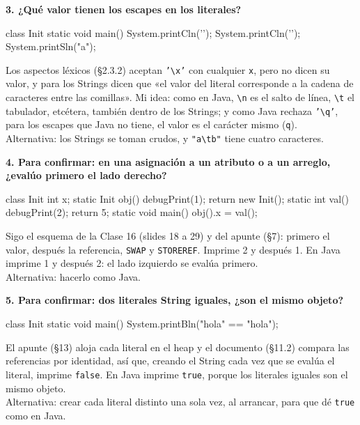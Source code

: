 \documentclass[12pt,a4paper]{article}
\newcommand{\cod}[1]{\texttt{#1}}
\newcommand{\pregunta}[1]{\par\medskip\needspace{4\baselineskip}\noindent\textbf{#1}\par\smallskip}
\begin{document}
\pregunta{3. ¿Qué valor tienen los escapes en los literales?}

\begin{fuente}
class Init {
    static void main() {
        System.printCln('\n');
        System.printCln('\q');
        System.printSln("a\tb");
    }
}
\end{fuente}

Los aspectos léxicos (§2.3.2) aceptan \cod{'\textbackslash x'} con cualquier \cod{x}, pero no dicen
su valor, y para los Strings dicen que «el valor del literal corresponde a la cadena de caracteres
entre las comillas». Mi idea: como en Java, \cod{\textbackslash n} es el salto de línea,
\cod{\textbackslash t} el tabulador, etcétera, también dentro de los Strings; y como Java rechaza
\cod{'\textbackslash q'}, para los escapes que Java no tiene, el valor es el carácter mismo
(\cod{q}).\\
Alternativa: los Strings se toman crudos, y \cod{"a\textbackslash tb"} tiene cuatro caracteres.

\pregunta{4. Para confirmar: en una asignación a un atributo o a un arreglo, ¿evalúo primero el lado derecho?}

\begin{fuente}
class Init {
    int x;
    static Init obj() { debugPrint(1); return new Init(); }
    static int val() { debugPrint(2); return 5; }
    static void main() {
        obj().x = val();
    }
}
\end{fuente}

Sigo el esquema de la Clase 16 (slides 18 a 29) y del apunte (§7): primero el valor, después la
referencia, \cod{SWAP} y \cod{STOREREF}. Imprime 2 y después 1. En Java imprime 1 y después 2: el
lado izquierdo se evalúa primero.\\
Alternativa: hacerlo como Java.

\pregunta{5. Para confirmar: dos literales String iguales, ¿son el mismo objeto?}

\begin{fuente}
class Init {
    static void main() {
        System.printBln("hola" == "hola");
    }
}
\end{fuente}

El apunte (§13) aloja cada literal en el heap y el documento (§11.2) compara las referencias por
identidad, así que, creando el String cada vez que se evalúa el literal, imprime \cod{false}. En
Java imprime \cod{true}, porque los literales iguales son el mismo objeto.\\
Alternativa: crear cada literal distinto una sola vez, al arrancar, para que dé \cod{true} como en
Java.
\end{document}
